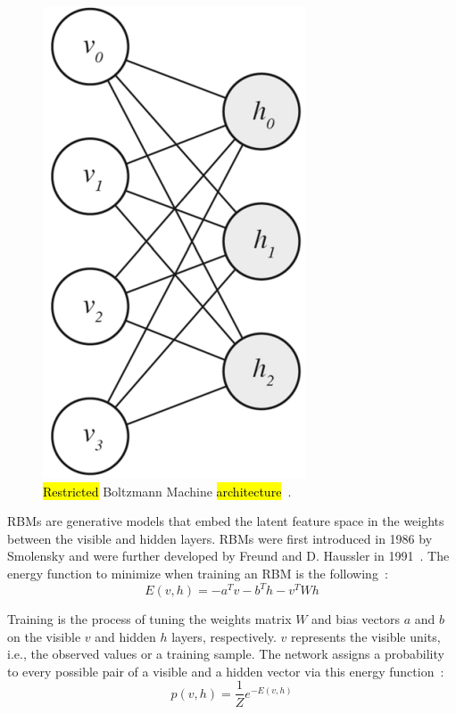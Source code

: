 \documentclass[technologies,article,accept,pdftex,moreauthors]{Definitions/mdpi}
\begin{document}
\vspace{-6pt}
\begin{figure}[H]
    \includegraphics[width=0.53\columnwidth]{rbmgraph.png}
    \caption{\label{fig:backprop}\hl{Restricted} %
 Boltzmann Machine \hl{architecture}~\cite{Jain2020}.}
\end{figure}



RBMs are generative models that embed the latent feature space in the weights between the visible and hidden layers. RBMs were first introduced in 1986 by Smolensky and were further developed by Freund and D. Haussler in 1991~\cite{Smolensky1986InformationPI,NIPS1991_33e8075e}. The energy function to minimize when training an RBM is the following~\cite{hopfield}: 
\begin{equation}
E(v, h) = -a^Tv -b^Th -v^TWh
\label{eq:rbmEnergy}
\end{equation}



Training is the process of tuning the weights matrix $W$ and bias vectors $a$ and $b$ on the visible $v$ and hidden $h$ layers, respectively. $v$ represents the visible units, i.e., the observed values or a training sample. The network assigns a probability to every possible pair of a visible and a hidden vector via this energy function~\cite{Hinton2012}: 
\begin{equation}
p(v, h) = \frac{1}{Z}e^{-E(v,h)}
\end{equation}
\end{document}

